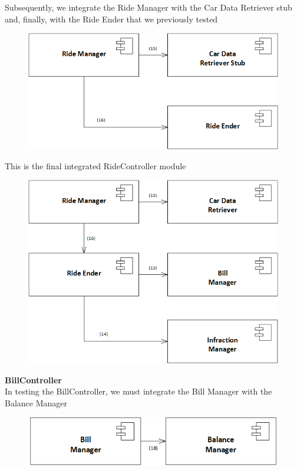 \documentclass{article}
\begin{document}
Subsequently, we integrate the Ride Manager with the Car Data Retriever stub and, finally, with the Ride Ender that we previously tested
\begin{figure}[H]
\includegraphics[scale=0.5]{RideController/RideController2}
\centering
\end{figure}
This is the final integrated RideController module
\begin{figure}[H]
\includegraphics[scale=0.5]{RideController/RideControllerIntegration}
\centering
\end{figure}
\textbf{BillController}
\\
In testing the BillController, we must integrate the Bill Manager with the Balance Manager
\begin{figure}[H]
\includegraphics[scale=0.5]{BillController/BillControllerFinal}
\centering
\end{figure}
\end{document}
